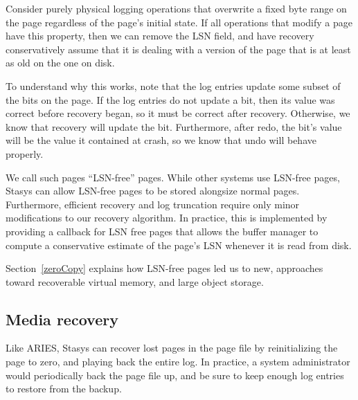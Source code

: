 \documentclass[letterpaper,twocolumn,10pt]{article}
\newcommand{\yad}{Stasys\xspace}
\newcommand{\eat}[1]{}
\begin{document}
Consider purely physical logging operations that overwrite a fixed
byte range on the page regardless of the page's initial state.  If all
operations that modify a page have this property, then we can remove
the LSN field, and have recovery conservatively assume that it is
dealing with a version of the page that is at least as old on the one
on disk.  

To understand why this works, note that the log entries
update some subset of the bits on the page.  If the log entries do not
update a bit, then its value was correct before recovery began, so it
must be correct after recovery.  Otherwise, we know that recovery will
update the bit.  Furthermore, after redo, the bit's value will be the
value it contained at crash, so we know that undo will behave
properly.

We call such pages
``LSN-free'' pages.  While other systems use LSN-free
pages,~\cite{rvm} \yad can allow LSN-free pages to be stored
alongsize normal pages.  Furthermore, efficient recovery and log
truncation require only minor modifications to our recovery algorithm.
In practice, this is implemented by providing a callback for LSN free
pages that allows the buffer manager to compute a conservative
estimate of the page's LSN whenever it is read from disk.

Section~\ref{zeroCopy} explains how LSN-free pages led us to new, 
approaches toward recoverable virtual memory, and large object storage.

\subsection{Media recovery}

Like ARIES, \yad can recover lost pages in the page file by reinitializing the page
to zero, and playing back the entire log.  In practice, a system
administrator would periodically back the page file up, and be sure to
keep enough log entries to restore from the backup.

\eat{  This is pretty redundant.
\subsection{Modular operations semantics}

The smallest unit of a \yad transaction is the {\em operation}.  An
operation consists of a {\em redo} function, {\em undo} function, and
a log format.  At runtime or if recovery decides to reapply the
operation, the redo function is invoked with the contents of the log
entry as an argument.  During abort, or if recovery decides to undo
the operation, the undo function is invoked with the contents of the
log as an argument.  Like Berkeley DB, and most database toolkits, we
allow system designers to define new operations.  Unlike earlier
systems, we have based our library of operations on object oriented
collection libraries, and have built complex index structures from
simpler structures.  These modules are all directly avaialable,
providing a wide range of data structures to applications, and
facilitating the develop of more complex structures through reuse.  We
compare the peroformance of our modular approach with a monolithic
implementation on top of \yad, using Berkeley DB as a baseline.
}
\end{document}
